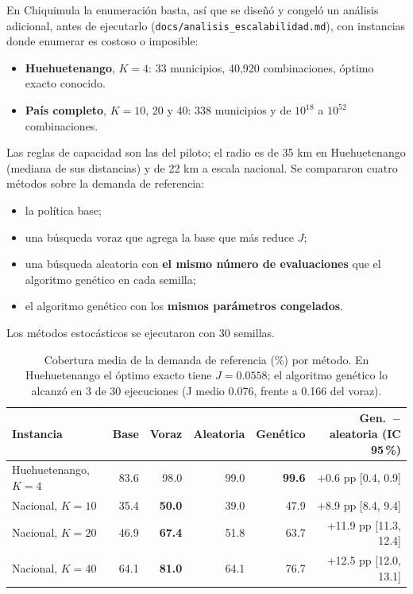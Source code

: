 \documentclass[11pt,letterpaper]{article}
\newcommand{\cod}[1]{\texttt{#1}}
\begin{document}
En Chiquimula la enumeración basta, así que se diseñó y congeló un análisis adicional, antes de ejecutarlo (\cod{docs/analisis\_escalabilidad.md}), con instancias donde enumerar es costoso o imposible:

\begin{itemize}[nosep]
  \item \textbf{Huehuetenango}, $K=4$: 33 municipios, 40{,}920 combinaciones, óptimo exacto conocido.
  \item \textbf{País completo}, $K=10$, 20 y 40: 338 municipios y de $10^{18}$ a $10^{52}$ combinaciones.
\end{itemize}

Las reglas de capacidad son las del piloto; el radio es de 35 km en Huehuetenango (mediana de sus distancias) y de 22 km a escala nacional. Se compararon cuatro métodos sobre la demanda de referencia:
\begin{itemize}[nosep]
  \item la política base;
  \item una búsqueda voraz que agrega la base que más reduce $J$;
  \item una búsqueda aleatoria con \textbf{el mismo número de evaluaciones} que el algoritmo genético en cada semilla;
  \item el algoritmo genético con los \textbf{mismos parámetros congelados}.
\end{itemize}
Los métodos estocásticos se ejecutaron con 30 semillas.

\begin{table}[htbp]
\centering
\small
\begin{tabular}{lrrrrr}
\toprule
Instancia & Base & Voraz & Aleatoria & Genético & Gen.\ $-$ aleatoria (IC 95\,\%) \\
\midrule
Huehuetenango, $K=4$ & 83.6 & 98.0 & 99.0 & \textbf{99.6} & +0.6 pp [0.4, 0.9] \\
Nacional, $K=10$ & 35.4 & \textbf{50.0} & 39.0 & 47.9 & +8.9 pp [8.4, 9.4] \\
Nacional, $K=20$ & 46.9 & \textbf{67.4} & 51.8 & 63.7 & +11.9 pp [11.3, 12.4] \\
Nacional, $K=40$ & 64.1 & \textbf{81.0} & 64.1 & 76.7 & +12.5 pp [12.0, 13.1] \\
\bottomrule
\end{tabular}
\caption{Cobertura media de la demanda de referencia (\%) por método. En Huehuetenango el óptimo exacto tiene $J=0.0558$; el algoritmo genético lo alcanzó en 3 de 30 ejecuciones (J medio 0.076, frente a 0.166 del voraz).}
\label{tab:escalabilidad}
\end{table}
\end{document}

